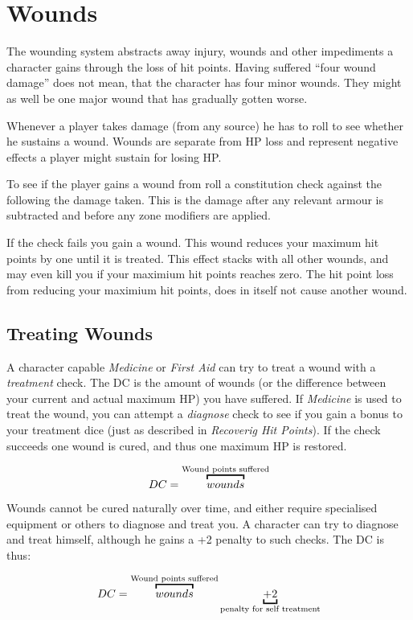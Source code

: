 \section{Wounds}
\label{sub:Wounds}

The wounding system abstracts away injury, wounds and other impediments a
character gains through the loss of hit points. Having suffered ``four wound
damage'' does not mean, that the character has four minor wounds. They might as
well be one major wound that has gradually gotten worse.

Whenever a player takes damage (from any source) he has to roll to see whether
he sustains a wound. Wounds are separate from HP loss and represent negative
effects a player might sustain for losing HP.

To see if the player gains a wound from roll a constitution check against the
following the damage taken. This is the damage after any relevant armour is
subtracted and before any zone modifiers are applied.

If the check fails you gain a wound. This wound reduces your maximum hit points
by one until it is treated. This effect stacks with all other wounds, and may
even kill you if your maximium hit points reaches zero. The hit point loss from
reducing your maximium hit points, does in itself not cause another wound.

\subsection{Treating Wounds}

A character capable \emph{Medicine} or \emph{First Aid} can try to treat a
wound with a \emph{treatment} check. The DC is the amount of wounds (or the
difference between your current and actual maximum HP) you have suffered. If
\emph{Medicine} is used to treat the wound, you can attempt a \emph{diagnose}
check to see if you gain a bonus to your treatment dice (just as described in
\emph{Recoverig Hit Points}). If the check succeeds one wound is cured, and
thus one maximum HP is restored.

\[
DC = \ob{wounds}{Wound points suffered}
\]

Wounds cannot be cured naturally over time, and either require specialised
equipment or others to diagnose and treat you. A character can try to diagnose
and treat himself, although he gains a +2 penalty to such checks. The DC is
thus:

\[
DC = \ob{wounds}{Wound points suffered} \ub{+ 2}{penalty for self treatment}
\]

